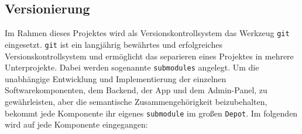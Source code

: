 \subsection{Versionierung}

Im Rahmen dieses Projektes wird als Versionskontrollsystem das Werkzeug \verb#git# eingesetzt.
\verb#git# ist ein langjährig bewährtes und erfolgreiches Versionskontrollsystem und ermöglicht das separieren eines Projektes in mehrere Unterprojekte.
Dabei werden sogenannte \verb#submodules# angelegt.
Um die unabhängige Entwicklung und Implementierung der einzelnen Softwarekomponenten, dem Backend, der App und dem Admin-Panel, zu gewährleisten, aber die semantische Zusammengehörigkeit beizubehalten,
bekommt jede Komponente ihr eigenes \verb#submodule# im großen \verb#Depot#.
Im folgenden wird auf jede Komponente eingegangen: